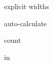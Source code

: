 \documentclass[
	layoutmode=block,
	blockwidth=240mm, blockheight=220mm,
	bleed=4mm,
	bindingoffset=5mm,
	imageblockwidth=0.98, imageblockheight=0.98,
	imageblockoffsettop=-0,
	9pt,final,openany
]{photobook}
\edef\TestImage{DSC00403-2}
\edef\TestImageV{DSC00403-2vert}
\begin{document}
\edef\foldmarkoffset{-2mm}

\begin{foldout}[10cm 10cm 10cm]
	explicit widths\\
\end{foldout}

\begin{foldout}[in in]
	auto-calculate\\
\end{foldout}

\begin{foldout}[3]
	count\\
\end{foldout}

\begin{foldout}[in]
	in\\
\end{foldout}
%
%
%
%
%
\end{document}

